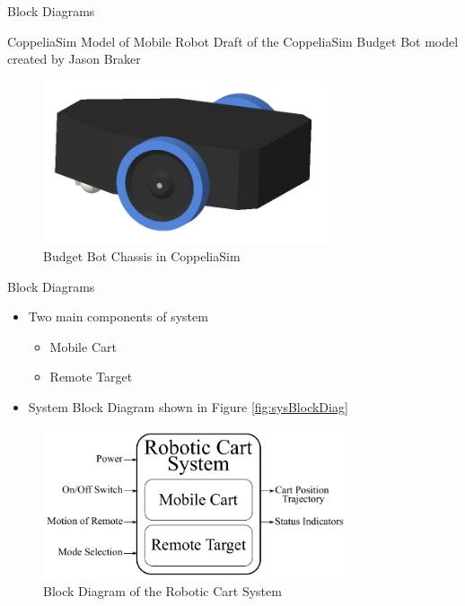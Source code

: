\documentclass{beamer}
\begin{document}
\begin{frame}{Block Diagrams}
    \begin{block}{CoppeliaSim Model of Mobile Robot}
    Draft of the CoppeliaSim Budget Bot model created by Jason Braker
    \end{block}
    \begin{figure}[b]
        \centering
        \includegraphics[width=0.75\textwidth]{figs/img/budgetBotModel}
        \caption{Budget Bot Chassis in CoppeliaSim}
        \label{fig:sysMobileBlockDiag}
    \end{figure}
\end{frame}


\begin{frame}{Block Diagrams}
    \begin{itemize}
        \item Two main components of system
            \begin{itemize}
                \item Mobile Cart
                \item Remote Target
            \end{itemize}
        \item System Block Diagram shown in Figure \autoref{fig:sysBlockDiag}
    \end{itemize}
    \begin{figure}[b]
        \centering
        \includegraphics[width=0.8\textwidth]{figs/system_block_diagram_2}
        \caption{Block Diagram of the Robotic Cart System}
        \label{fig:sysBlockDiag}
    \end{figure}
\end{frame}
\end{document}
